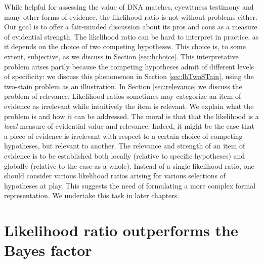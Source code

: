 \documentclass[
  10pt,
  dvipsnames,enabledeprecatedfontcommands]{scrartcl}
\begin{document}
While helpful for assessing the value of DNA matches, eyewitness
testimony and many other forms of evidence, the likelihood ratio is not
without problems either. Our goal is to offer a fair-minded discussion
about its pros and cons as a measure of evidential strength. The
likelihood ratio can be hard to interpret in practice, as it depends on
the choice of two competing hypotheses. This choice is, to some extent,
subjective, as we discuss in Section \ref{sec:hchoice}. This
interpretative problem arises partly because the competing hypotheses
admit of different levels of specificity: we discuss this phenomenon in
Section \ref{sec:lhTwoSTain}, using the two-stain problem as an
illustration. In Section \ref{sec:relevance} we discuss the problem of
relevance. Likelihood ratios sometimes may categorize an item of
evidence as irrelevant while intuitively the item is relevant. We
explain what the problem is and how it can be addressed. The moral is
that that the likelihood is a \textit{local} measure of evidential value
and relevance. Indeed, it might be the case that a piece of evidence is
irrelevant with respect to a certain choice of competing hypotheses, but
relevant to another. The relevance and strength of an item of evidence
is to be established both locally (relative to specific hypotheses) and
globally (relative to the case as a whole). Instead of a single
likelihood ratio, one should consider various likelihood ratios arising
for various selections of hypotheses at play. This suggests the need of
formulating a more complex formal representation. We undertake this task
in later chapters.

\hypertarget{likelihood-ratio-outperforms-the-bayes-factor}{%
\section{Likelihood ratio outperforms the Bayes
factor}\label{likelihood-ratio-outperforms-the-bayes-factor}}

\label{sec:lr}
\end{document}

